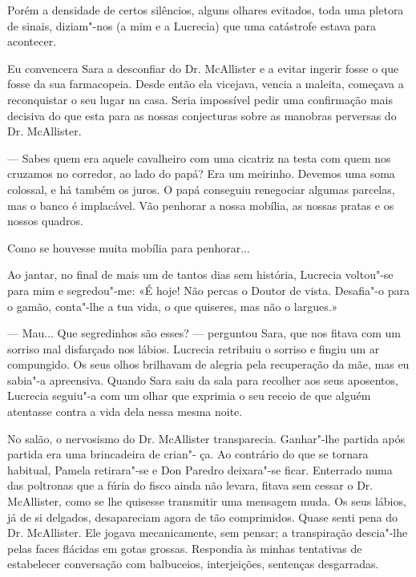 Porém a densidade de certos silêncios, alguns olhares evitados, toda uma pletora de sinais, diziam"-nos (a mim e a Lucrecia) que
uma catástrofe estava para acontecer.



Eu convencera Sara a desconfiar do Dr. McAllister e a evitar ingerir
fosse o que fosse da sua farmacopeia. Desde então ela vicejava, vencia a
maleita, começava a reconquistar o seu lugar na casa. Seria impossível
pedir uma confirmação mais decisiva do que esta para as nossas
conjecturas sobre as manobras perversas do Dr. McAllister.

--- Sabes quem era aquele cavalheiro com uma cicatriz na testa com quem
  nos cruzamos no corredor, ao lado do papá? Era um meirinho. Devemos
  uma soma colossal, e há também os juros. O papá conseguiu renegociar
  algumas parcelas, mas o banco é implacável. Vão penhorar a nossa
  mobília, as nossas pratas e os nossos quadros.

Como se houvesse muita mobília para penhorar...

Ao jantar, no final de mais um de tantos dias sem história, Lucrecia
voltou"-se para mim e segredou"-me: «É hoje! Não percas o Doutor de
vista. Desafia"-o para o gamão, conta"-lhe a tua vida, o que quiseres, mas
não o largues.»

--- Mau... Que segredinhos são esses? --- perguntou Sara, que nos fitava
  com um sorriso mal disfarçado nos lábios. Lucrecia retribuiu o
  sorriso e fingiu um ar compungido. Os seus olhos brilhavam de alegria
  pela recuperação da mãe, mas eu sabia"-a apreensiva. Quando Sara saiu
  da sala para recolher aos seus aposentos, Lucrecia seguiu"-a com um
  olhar que exprimia o seu receio de que alguém atentasse contra a vida
  dela nessa mesma noite.

No salão, o nervosismo do Dr. McAllister transparecia. Ganhar"-lhe
partida após partida era uma brincadeira de crian"- ça. Ao contrário do
que se tornara habitual, Pamela retirara"-se e Don Paredro deixara"-se
ficar. Enterrado numa das poltronas que a fúria do fisco ainda não
levara, fitava sem cessar o Dr. McAllister, como se lhe quisesse
transmitir uma mensagem
muda. Os seus lábios, já de si delgados, desapareciam agora de tão
comprimidos. Quase senti pena do Dr. McAllister. Ele jogava
mecanicamente, sem pensar; a transpiração descia"-lhe pelas faces
flácidas em gotas grossas. Respondia às minhas tentativas de estabelecer
conversação com balbuceios, interjeições, sentenças desgarradas.

